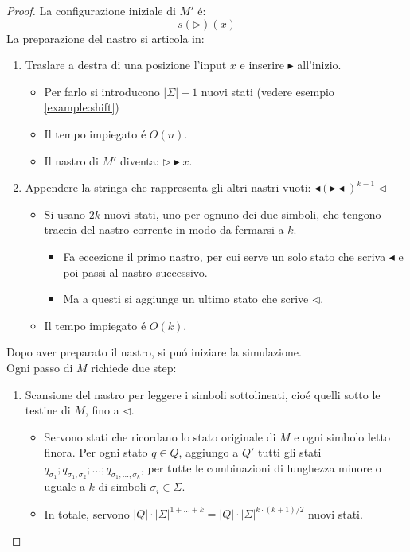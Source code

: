 \begin{proof}
La configurazione iniziale di $M'$ é: \[s(\triangleright)(x)\]
La preparazione del nastro si articola in:
\begin{enumerate}
	\item Traslare a destra di una posizione l'input $x$ e inserire $\blacktriangleright$ all'inizio.
		\begin{itemize}
			\item Per farlo si introducono $|\Sigma| + 1$ nuovi stati (vedere esempio \ref{example:shift})
			\item Il tempo impiegato é $O(n)$.
			\item Il nastro di $M'$ diventa: $\triangleright \blacktriangleright x$.
		\end{itemize} 
	\item Appendere la stringa che rappresenta gli altri nastri vuoti: $\blacktriangleleft ({\blacktriangleright \blacktriangleleft})^{k-1} \triangleleft$
		\begin{itemize}
			\item Si usano $2k$ nuovi stati, uno per ognuno dei due simboli, che tengono traccia del nastro corrente in modo da fermarsi a $k$. 
			\begin{itemize}
				\item Fa eccezione il primo nastro, per cui serve un solo stato che scriva $\blacktriangleleft$ e poi passi al nastro successivo. 
				\item Ma a questi si aggiunge un ultimo stato che scrive $\triangleleft$.
			\end{itemize}
			\item Il tempo impiegato é $O(k)$.
		\end{itemize}
\end{enumerate}
{
Dopo aver preparato il nastro, si puó iniziare la simulazione. \\
Ogni passo di $M$ richiede due step:
\begin{enumerate}
	\item Scansione del nastro per leggere i simboli sottolineati, cioé quelli sotto le testine di $M$, fino a $\triangleleft$.
		\begin{itemize}
			\item Servono stati che ricordano lo stato originale di $M$ e ogni simbolo letto finora. Per ogni stato $q \in Q$, aggiungo a $Q'$ tutti gli stati $q_{\sigma_1}; q_{\sigma_1, \sigma_2}; \dots; q_{\sigma_1, \dots, \sigma_k}$, per tutte le combinazioni di lunghezza minore o uguale a $k$ di simboli $\sigma_i \in \Sigma$. 
			\item In totale, servono $|Q| \cdot |\Sigma|^{1 + \dots + k} = |Q| \cdot |\Sigma|^{k \cdot (k+1)/2}$ nuovi stati.

\end{itemize}
\end{enumerate}}
\end{proof}
